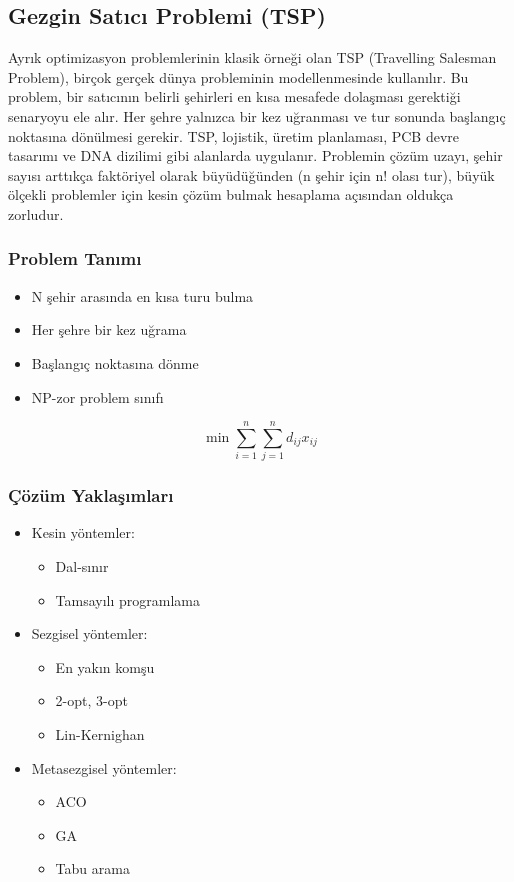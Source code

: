 \subsection{Gezgin Satıcı Problemi (TSP)}
Ayrık optimizasyon problemlerinin klasik örneği olan TSP (Travelling Salesman Problem), birçok gerçek dünya probleminin modellenmesinde kullanılır. Bu problem, bir satıcının belirli şehirleri en kısa mesafede dolaşması gerektiği senaryoyu ele alır. Her şehre yalnızca bir kez uğranması ve tur sonunda başlangıç noktasına dönülmesi gerekir. TSP, lojistik, üretim planlaması, PCB devre tasarımı ve DNA dizilimi gibi alanlarda uygulanır. Problemin çözüm uzayı, şehir sayısı arttıkça faktöriyel olarak büyüdüğünden (n şehir için n! olası tur), büyük ölçekli problemler için kesin çözüm bulmak hesaplama açısından oldukça zorludur.

\subsubsection{Problem Tanımı}
\begin{itemize}
    \item N şehir arasında en kısa turu bulma
    \item Her şehre bir kez uğrama
    \item Başlangıç noktasına dönme
    \item NP-zor problem sınıfı
\end{itemize}

\begin{equation}
\min \sum_{i=1}^n \sum_{j=1}^n d_{ij}x_{ij}
\end{equation}


\subsubsection{Çözüm Yaklaşımları}
\begin{itemize}
    \item Kesin yöntemler:
        \begin{itemize}
            \item Dal-sınır
            \item Tamsayılı programlama
        \end{itemize}
    \item Sezgisel yöntemler:
        \begin{itemize}
            \item En yakın komşu
            \item 2-opt, 3-opt
            \item Lin-Kernighan
        \end{itemize}
    \item Metasezgisel yöntemler:
        \begin{itemize}
            \item ACO
            \item GA
            \item Tabu arama
        \end{itemize}
\end{itemize}

